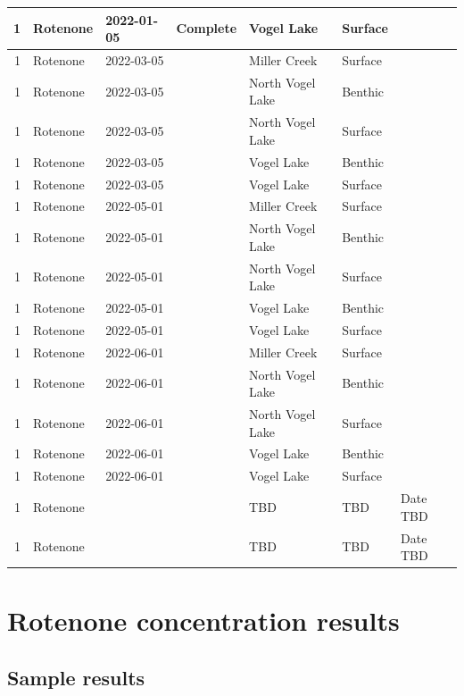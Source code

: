 \documentclass[
]{book}
\begin{document}
\begin{table}
\begin{tabular}[t]{r|l|l|l|l|l|l}
1 & Rotenone & 2022-01-05 & Complete & Vogel Lake & Surface & \\
\hline
1 & Rotenone & 2022-03-05 &  & Miller Creek & Surface & \\
\hline
1 & Rotenone & 2022-03-05 &  & North Vogel Lake & Benthic & \\
\hline
1 & Rotenone & 2022-03-05 &  & North Vogel Lake & Surface & \\
\hline
1 & Rotenone & 2022-03-05 &  & Vogel Lake & Benthic & \\
\hline
1 & Rotenone & 2022-03-05 &  & Vogel Lake & Surface & \\
\hline
1 & Rotenone & 2022-05-01 &  & Miller Creek & Surface & \\
\hline
1 & Rotenone & 2022-05-01 &  & North Vogel Lake & Benthic & \\
\hline
1 & Rotenone & 2022-05-01 &  & North Vogel Lake & Surface & \\
\hline
1 & Rotenone & 2022-05-01 &  & Vogel Lake & Benthic & \\
\hline
1 & Rotenone & 2022-05-01 &  & Vogel Lake & Surface & \\
\hline
1 & Rotenone & 2022-06-01 &  & Miller Creek & Surface & \\
\hline
1 & Rotenone & 2022-06-01 &  & North Vogel Lake & Benthic & \\
\hline
1 & Rotenone & 2022-06-01 &  & North Vogel Lake & Surface & \\
\hline
1 & Rotenone & 2022-06-01 &  & Vogel Lake & Benthic & \\
\hline
1 & Rotenone & 2022-06-01 &  & Vogel Lake & Surface & \\
\hline
1 & Rotenone &  &  & TBD & TBD & Date TBD\\
\hline
1 & Rotenone &  &  & TBD & TBD & Date TBD\\
\hline
\end{tabular}
\end{table}

\hypertarget{rotenone-concentration-results}{%
\section{Rotenone concentration results}\label{rotenone-concentration-results}}

\hypertarget{sample-results}{%
\subsection{Sample results}\label{sample-results}}
\end{document}
